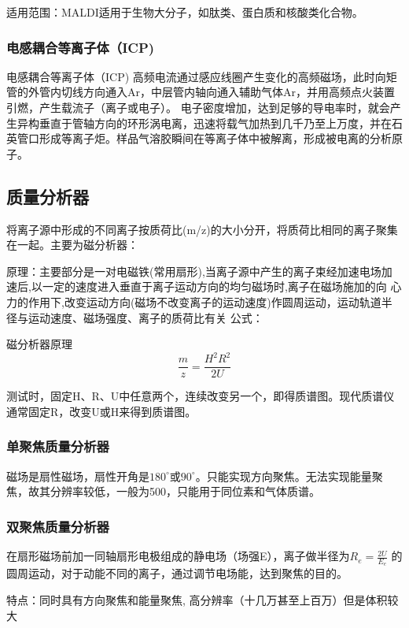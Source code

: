     适用范围：MALDI适用于生物大分子，如肽类、蛋白质和核酸类化合物。

\subsubsection*{电感耦合等离子体（ICP)}
    \begin{definition*}{电感耦合等离子体（ICP)}
        高频电流通过感应线圈产生变化的高频磁场，此时向矩管的外管内切线方向通入Ar，中层管内轴向通入辅助气体Ar，并用高频点火装置引燃，产生载流子（离子或电子）。 电子密度增加，达到足够的导电率时，就会产生异构垂直于管轴方向的环形涡电离，迅速将载气加热到几千乃至上万度，并在石英管口形成等离子炬。样品气溶胶瞬间在等离子体中被解离，形成被电离的分析原子。
    \end{definition*}


\subsection{质量分析器}
将离子源中形成的不同离子按质荷比(m/z)的大小分开，将质荷比相同的离子聚集在一起。主要为磁分析器：

原理：主要部分是一对电磁铁(常用扇形),当离子源中产生的离子束经加速电场加速后,以一定的速度进入垂直于离子运动方向的均匀磁场时,离子在磁场施加的向
心力的作用下,改变运动方向(磁场不改变离子的运动速度)作圆周运动，运动轨道半径与运动速度、磁场强度、离子的质荷比有关
公式：
\begin{theorem*}{磁分析器原理}
    \begin{equation*}
        \frac{m}{z}=\frac{H^{2}R^{2}}{2U}
    \end{equation*}
\end{theorem*}

测试时，固定H、R、U中任意两个，连续改变另一个，即得质谱图。现代质谱仪通常固定R，改变U或H来得到质谱图。
\subsubsection*{单聚焦质量分析器}
磁场是扇性磁场，扇性开角是$180^{\circ}$或$90^{\circ}$。只能实现方向聚焦。无法实现能量聚焦，故其分辨率较低，一般为500，只能用于同位素和气体质谱。
\subsubsection*{双聚焦质量分析器}
在扇形磁场前加一同轴扇形电极组成的静电场（场强E），离子做半径为$R_{e}=\frac{2U}{E_{e}}$
的圆周运动，对于动能不同的离子，通过调节电场能，达到聚焦的目的。

特点：同时具有方向聚焦和能量聚焦, 高分辨率（十几万甚至上百万）但是体积较大
